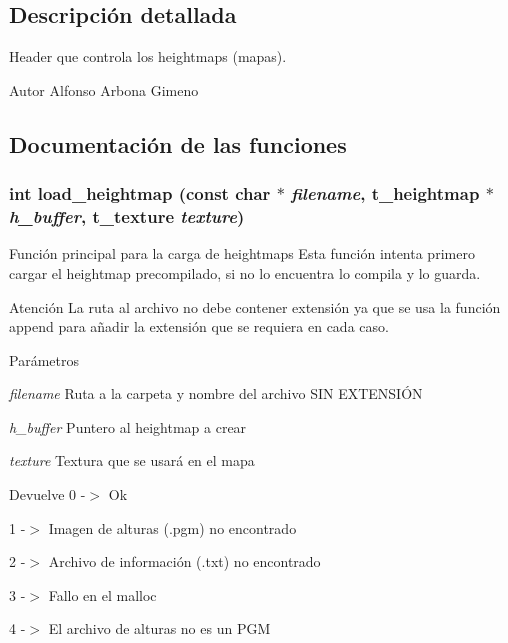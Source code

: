 \subsection{Descripción detallada}
Header que controla los heightmaps (mapas). \begin{DoxyAuthor}{Autor}
Alfonso Arbona Gimeno 
\end{DoxyAuthor}


\subsection{Documentación de las funciones}
\subsubsection[{load\_\-heightmap}]{\setlength{\rightskip}{0pt plus 5cm}int load\_\-heightmap (const char $\ast$ {\em filename}, \/  {\bf t\_\-heightmap} $\ast$ {\em h\_\-buffer}, \/  {\bf t\_\-texture} {\em texture})}\label{heightmap_8h_a2d71672188b29fc583865d61ff526d86}


Función principal para la carga de heightmaps Esta función intenta primero cargar el heightmap precompilado, si no lo encuentra lo compila y lo guarda. \begin{DoxyWarning}{Atención}
La ruta al archivo no debe contener extensión ya que se usa la función append para añadir la extensión que se requiera en cada caso. 
\end{DoxyWarning}

\begin{DoxyParams}{Parámetros}
\item[{\em filename}]Ruta a la carpeta y nombre del archivo SIN EXTENSIÓN \item[{\em h\_\-buffer}]Puntero al heightmap a crear \item[{\em texture}]Textura que se usará en el mapa \end{DoxyParams}
\begin{DoxyReturn}{Devuelve}
0 -\/$>$ Ok 

1 -\/$>$ Imagen de alturas (.pgm) no encontrado 

2 -\/$>$ Archivo de información (.txt) no encontrado 

3 -\/$>$ Fallo en el malloc 

4 -\/$>$ El archivo de alturas no es un PGM 
\end{DoxyReturn}
